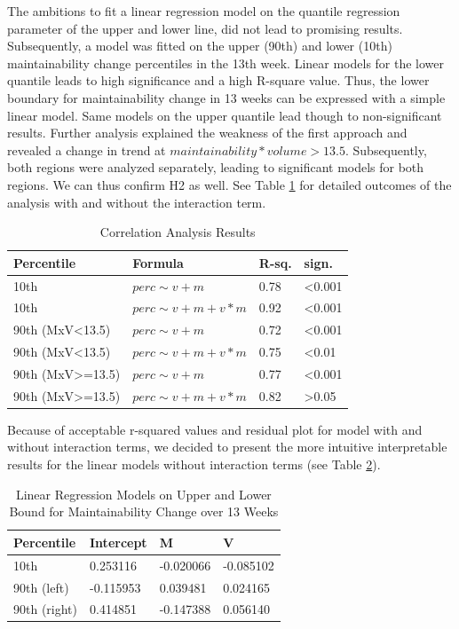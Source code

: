 The ambitions to fit a linear regression model on the quantile regression parameter of the upper and lower line, did not lead to promising results. 
Subsequently, a model was fitted on the upper (90th) and lower (10th) maintainability change percentiles in the 13th week.  
Linear models for the lower quantile leads to high significance and a high R-square value. Thus, the lower boundary for maintainability change in 13 weeks can be expressed with a simple linear model. Same models on the upper quantile lead though to non-significant results. Further analysis explained the weakness of the first approach and revealed a change in trend at \(maintainability*volume>13.5\). 
Subsequently, both regions were analyzed separately, leading to significant models for both regions. We can thus confirm H2 as well. See Table \ref{correlations} for detailed outcomes of the analysis with and without the interaction term. 
\begin{table}[htbp!]
\caption{Correlation Analysis Results}
\begin{tabular}{l  l l p{0.7cm}}
  \hline			
  Percentile & Formula & R-sq. & sign.\\ \hline
  10th & \(perc\sim v+m\) & 0.78 & \textless 0.001\\
  10th & \(perc\sim v+m+v*m\) & 0.92 & \textless 0.001\\ 
  90th (MxV\textless13.5) & \(perc\sim v+m\) & 0.72 & \textless 0.001\\
  90th (MxV\textless13.5) & \(perc\sim v+m+v*m\) & 0.75 & \textless 0.01\\
  90th (MxV\textgreater=13.5) & \(perc\sim v+m\) & 0.77 & \textless 0.001\\
  90th (MxV\textgreater=13.5) & \(perc\sim v+m+v*m\) & 0.82 & \textgreater 0.05\\
\end{tabular}
\label{correlations}
\end{table}

Because of acceptable r-squared values and residual plot for model with and without interaction terms, we decided to present the more intuitive interpretable results for the linear models without interaction terms (see Table \ref{results}).
\begin{table}[htbp!]
\centering
\caption{Linear Regression Models on Upper and Lower Bound for Maintainability Change over 13 Weeks}
\begin{tabular}{l  l  l p{1.2cm}}
  \hline			
  Percentile & Intercept & M & V\\ \hline
  10th & 0.253116 & -0.020066 & -0.085102\\ 
  90th (left) & -0.115953 & 0.039481 & 0.024165\\
  90th (right) & 0.414851 & -0.147388 & 0.056140\\
\end{tabular}
\label{results}
\end{table}

